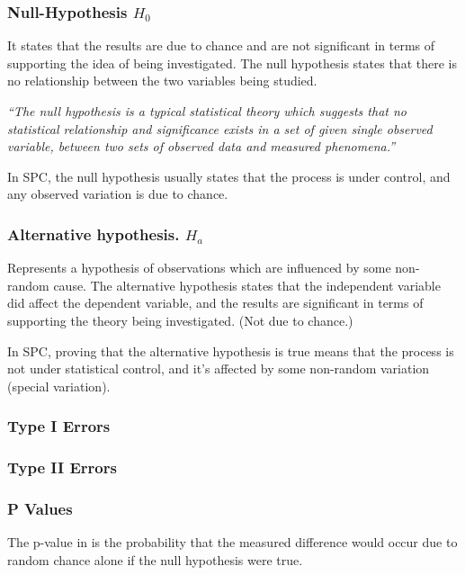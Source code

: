 \documentclass[11pt]{article}
\begin{document}
\hypertarget{null-hypothesis-h_0}{%
\subsubsection{Null-Hypothesis \(H_0\)}\label{null-hypothesis-h_0}}

It states that the results are due to chance and are not significant in
terms of supporting the idea of being investigated. The null hypothesis
states that there is no relationship between the two variables being
studied.

\emph{``The null hypothesis is a typical statistical theory which
suggests that no statistical relationship and significance exists in a
set of given single observed variable, between two sets of observed data
and measured phenomena.''}

In SPC, the null hypothesis usually states that the process is under
control, and any observed variation is due to chance.

\hypertarget{alternative-hypothesis.-h_a}{%
\subsubsection{Alternative hypothesis. \(H_a\)}\label{alternative-hypothesis.-h_a}}

Represents a hypothesis of observations which are influenced by some
non-random cause. The alternative hypothesis states that the independent
variable did affect the dependent variable, and the results are
significant in terms of supporting the theory being investigated. (Not
due to chance.)

In SPC, proving that the alternative hypothesis is true means that the
process is not under statistical control, and it's affected by some
non-random variation (special variation).

\hypertarget{type_1_errors}{%
\subsubsection{Type I Errors}\label{type_1_errors}}

\hypertarget{type_2_errors}{%
\subsubsection{Type II Errors}\label{type_2_errors}}

\hypertarget{p-values}{%
\subsubsection{P Values}\label{p-values}}
The p-value in is the probability that the measured difference would occur 
due to random chance alone if the null hypothesis were true. 
\end{document}
